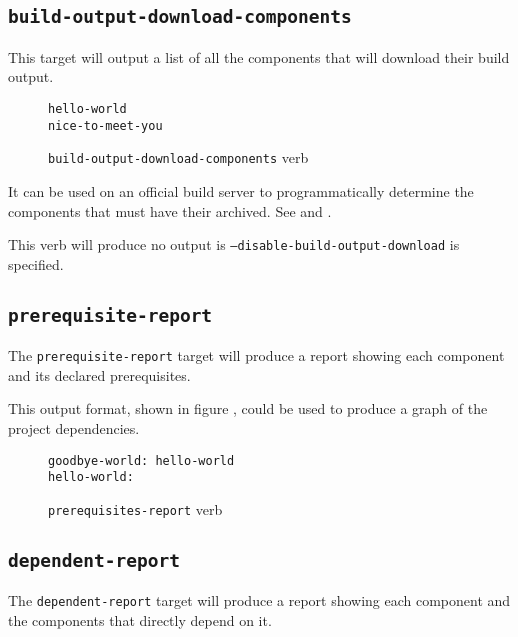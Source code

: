 \subsection{\texttt{build-output-download-components}}
\label{build-output-download-components}

This target will output a list of all the components that will
download their build output.

\begin{figure}[tbh]
\hrulefill
\begin{verbatim}
hello-world
nice-to-meet-you
\end{verbatim}
\hrulefill
\caption{\texttt{build-output-download-components} verb}
\label{usinglmsbw:{build-output-download-components-verb}}
\end{figure}

It can be used on an official build server to programmatically
determine the components that must have their \destdir archived.  See
 and
.

This verb will produce no output is
\texttt{--disable-build-output-download} is specified.

\subsection{\texttt{prerequisite-report}}
\label{usinglmsbw:prerequisite-report}

  The \texttt{prerequisite-report} target will produce a report showing
  each component and its declared prerequisites.

This output format, shown in figure
, could be used to produce a
graph of the project dependencies.

\begin{figure}[tbh]
\hrulefill
\begin{verbatim}
goodbye-world: hello-world
hello-world:
\end{verbatim}
\hrulefill
\caption{\texttt{prerequisites-report} verb}\label{usinglmsbw:prerequisites-verb}
\end{figure}


\subsection{\texttt{dependent-report}}\label{usinglmsbw:dependent-report}

The \texttt{dependent-report} target will produce a report showing
each component and the components that directly depend on it.

